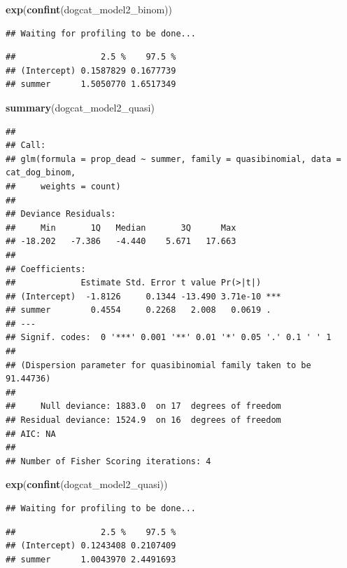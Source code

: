 \documentclass[]{article}
\newenvironment{Shaded}{\begin{snugshade}}{\end{snugshade}}
\newcommand{\KeywordTok}[1]{\textcolor[rgb]{0.13,0.29,0.53}{\textbf{#1}}}
\newcommand{\NormalTok}[1]{#1}
\begin{document}
\begin{Shaded}
\begin{Highlighting}[]
\KeywordTok{exp}\NormalTok{(}\KeywordTok{confint}\NormalTok{(dogcat_model2_binom))}
\end{Highlighting}
\end{Shaded}

\begin{verbatim}
## Waiting for profiling to be done...
\end{verbatim}

\begin{verbatim}
##                 2.5 %    97.5 %
## (Intercept) 0.1587829 0.1677739
## summer      1.5050770 1.6517349
\end{verbatim}

\begin{Shaded}
\begin{Highlighting}[]
\KeywordTok{summary}\NormalTok{(dogcat_model2_quasi)}
\end{Highlighting}
\end{Shaded}

\begin{verbatim}
## 
## Call:
## glm(formula = prop_dead ~ summer, family = quasibinomial, data = cat_dog_binom, 
##     weights = count)
## 
## Deviance Residuals: 
##     Min       1Q   Median       3Q      Max  
## -18.202   -7.386   -4.440    5.671   17.663  
## 
## Coefficients:
##             Estimate Std. Error t value Pr(>|t|)    
## (Intercept)  -1.8126     0.1344 -13.490 3.71e-10 ***
## summer        0.4554     0.2268   2.008   0.0619 .  
## ---
## Signif. codes:  0 '***' 0.001 '**' 0.01 '*' 0.05 '.' 0.1 ' ' 1
## 
## (Dispersion parameter for quasibinomial family taken to be 91.44736)
## 
##     Null deviance: 1883.0  on 17  degrees of freedom
## Residual deviance: 1524.9  on 16  degrees of freedom
## AIC: NA
## 
## Number of Fisher Scoring iterations: 4
\end{verbatim}

\begin{Shaded}
\begin{Highlighting}[]
\KeywordTok{exp}\NormalTok{(}\KeywordTok{confint}\NormalTok{(dogcat_model2_quasi))}
\end{Highlighting}
\end{Shaded}

\begin{verbatim}
## Waiting for profiling to be done...
\end{verbatim}

\begin{verbatim}
##                 2.5 %    97.5 %
## (Intercept) 0.1243408 0.2107409
## summer      1.0043970 2.4491693
\end{verbatim}
\end{document}
